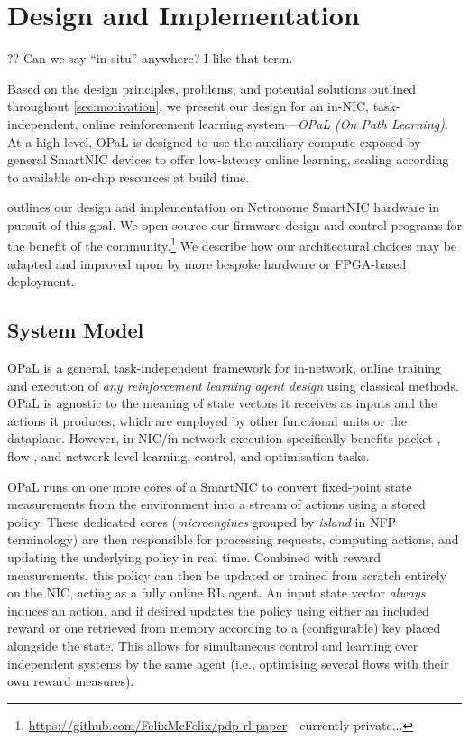 \documentclass[sigconf,natbib=false]{acmart}
\newcommand{\approach}{On Path Learning}
\newcommand{\approachshort}{OPaL}
\begin{document}
\section{Design and Implementation}\label{sec:design}
?? Can we say ``in-situ'' anywhere? I like that term.

Based on the design principles, problems, and potential solutions outlined throughout \cref{sec:motivation}, we present our design for an in-NIC, task-independent, online reinforcement learning system---\emph{\approachshort{} (\approach)}.
At a high level, \approachshort{} is designed to use the auxiliary compute exposed by general SmartNIC devices to offer low-latency online learning, scaling according to available on-chip resources at build time.

 outlines our design and implementation on Netronome SmartNIC hardware in pursuit of this goal.
We open-source our firmware design and control programs for the benefit of the community.\footnote{\url{https://github.com/FelixMcFelix/pdp-rl-paper}---currently private...}
We describe how our architectural choices may be adapted and improved upon by more bespoke hardware or FPGA-based deployment.

\subsection{System Model}
\approachshort{} is a general, task-independent framework for in-network, online training and execution of \emph{any reinforcement learning agent design} using classical methods.
\approachshort{} is agnostic to the meaning of state vectors it receives as inputs and the actions it produces, which are employed by other functional units or the dataplane.
However, in-NIC/in-network execution specifically benefits packet-, flow-, and network-level learning, control, and optimisation tasks.

\approachshort{} runs on one more cores of a SmartNIC to convert fixed-point state measurements from the environment into a stream of actions using a stored policy.
These dedicated cores (\emph{microengines} grouped by \emph{island} in NFP terminology) are then responsible for processing requests, computing actions, and updating the underlying policy in real time.
Combined with reward measurements, this policy can then be updated or trained from scratch entirely on the NIC, acting as a fully online RL agent.
An input state vector \emph{always} induces an action, and if desired updates the policy using either an included reward or one retrieved from memory according to a (configurable) key placed alongside the state.
This allows for simultaneous control and learning over independent systems by the same agent (i.e., optimising several flows with their own reward measures).
\end{document}
